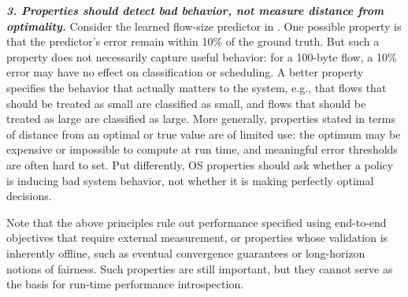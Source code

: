 \medskip\noindent
{\em \textbf{3. Properties should detect bad behavior, not measure distance from optimality.}}
Consider the learned flow-size predictor in . One possible property is that the predictor's error remain within 10\% of the ground truth. But such a property does not necessarily capture useful behavior: for a 100-byte flow, a 10\% error may have no effect on classification or scheduling. A better property specifies the behavior that actually matters to the system, e.g., that flows that should be treated as small are classified as small, and flows that should be treated as large are classified as large. More generally, properties stated in terms of distance from an optimal or true value are of limited use: the optimum may be expensive or impossible to compute at run time, and meaningful error thresholds are often hard to set. Put differently, OS properties should ask whether a policy is inducing bad system behavior, not whether it is making perfectly optimal decisions. 



Note that the above principles rule out performance specified using end-to-end objectives that require external measurement, or properties whose validation is inherently offline, such as eventual convergence guarantees or long-horizon notions of fairness.
Such properties are still important, but they cannot serve as the basis for run-time performance introspection.

